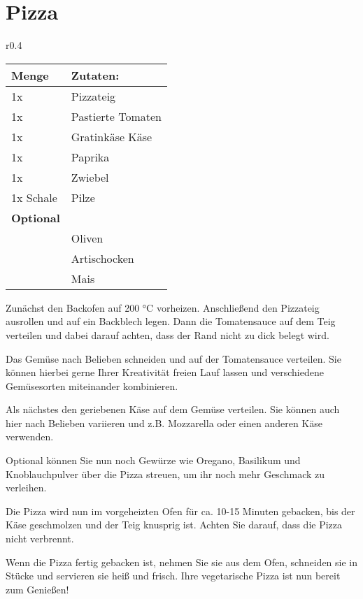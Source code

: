 \documentclass[../../book.tex]{subfiles}
\begin{document}
\section{Pizza}
\begin{wraptable}{r}{0.4\textwidth}
    \centering
    \begin{tabularx}{0.39\textwidth}{|l|X|}
        \toprule
        Menge & Zutaten: \\
        \midrule
        1x & Pizzateig \\
        \midrule
        1x & Pastierte Tomaten \\
        \midrule
        1x & Gratinkäse Käse\\
        \midrule
        1x & Paprika\\
        \midrule
        1x & Zwiebel\\
        \midrule
        1x Schale & Pilze\\
        \midrule
        \textbf{Optional} & \\
        \midrule
        & Oliven\\
        \midrule
        & Artischocken\\
        \midrule
        & Mais\\
        \bottomrule
    \end{tabularx}
\end{wraptable}
Zunächst den Backofen auf 200 °C vorheizen. Anschließend den Pizzateig ausrollen und auf ein Backblech legen. Dann die Tomatensauce auf dem Teig verteilen und dabei darauf achten, dass der Rand nicht zu dick belegt wird.

Das Gemüse nach Belieben schneiden und auf der Tomatensauce verteilen. Sie können hierbei gerne Ihrer Kreativität freien Lauf lassen und verschiedene Gemüsesorten miteinander kombinieren.

Als nächstes den geriebenen Käse auf dem Gemüse verteilen. Sie können auch hier nach Belieben variieren und z.B. Mozzarella oder einen anderen Käse verwenden.

Optional können Sie nun noch Gewürze wie Oregano, Basilikum und Knoblauchpulver über die Pizza streuen, um ihr noch mehr Geschmack zu verleihen.

Die Pizza wird nun im vorgeheizten Ofen für ca. 10-15 Minuten gebacken, bis der Käse geschmolzen und der Teig knusprig ist. Achten Sie darauf, dass die Pizza nicht verbrennt.

Wenn die Pizza fertig gebacken ist, nehmen Sie sie aus dem Ofen, schneiden sie in Stücke und servieren sie heiß und frisch. Ihre vegetarische Pizza ist nun bereit zum Genießen!
\end{document}
